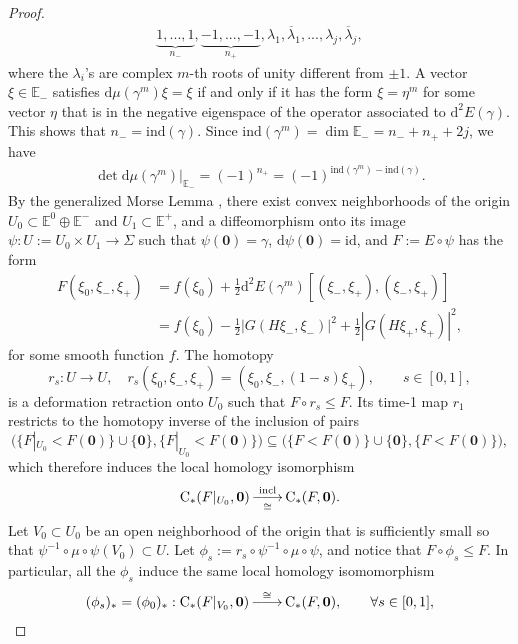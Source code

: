 \documentclass[reqno]{amsart}
\numberwithin{equation}{section}
\theoremstyle{personal}%
\theoremstyle{definition}
\newcommand{\E}{\mathds{E}}
\newcommand{\diff}{\mathrm{d}}
\newcommand{\incl}{\mathrm{incl}}
\newcommand{\Loc}{\mathrm{C}}
\newcommand{\ind}{\mathrm{ind}}
\DeclareRobustCommand{\llongrightarrow}{\relbar\joinrel\relbar\joinrel\rightarrow}
\DeclareMathOperator*{\ttoup}{\llongrightarrow}
\begin{document}
\begin{proof}
\begin{align*}
\underbrace{1,...,1}_{n_-},\underbrace{-1,...,-1}_{n_+},\lambda_1,\overline\lambda_1,...,\lambda_j,\overline\lambda_j,
\end{align*}
where the $\lambda_i$'s are complex $m$-th roots of unity different from $\pm1$. A vector $\xi\in\E_-$ satisfies $\diff\mu(\gamma^m)\xi=\xi$ if and only if it has the form $\xi=\eta^m$ for some vector $\eta$ that is in the negative eigenspace of the operator associated to $\diff^2E(\gamma)$. This shows that $n_-=\ind(\gamma)$. Since $\ind(\gamma^m)=\dim\E_-=n_-+n_++2j$, we have
\begin{align}
\label{e:det}
 \det\diff\mu(\gamma^m)|_{\E_-}
 =
 (-1)^{n_+}
 =
 (-1)^{\ind(\gamma^m)-\ind(\gamma)}.
\end{align}
By the generalized Morse Lemma \cite[Lemma~1]{Gromoll:1969jy}, there exist convex neighborhoods of the origin 
$U_0\subset\E^0\oplus\E^-$ and $U_1\subset\E^+$, 
and a diffeomorphism onto its image $\psi:U:=U_0\times U_1\to\Sigma$ such that $\psi(\bm0)=\gamma$, $\diff\psi(\bm0)=\mathrm{id}$, and $F:=E\circ\psi$ has the form 
\begin{align*}
F(\xi_0,\xi_-,\xi_+)
&=f(\xi_0)+\tfrac12\diff^2E(\gamma^m)[(\xi_-,\xi_+),(\xi_-,\xi_+)]\\ 
&=f(\xi_0)
-\tfrac12|G(H\xi_-,\xi_-)|^2
+\tfrac12|G(H\xi_+,\xi_+)|^2,
\end{align*}
for some smooth function $f$. The homotopy 
\[r_s:U\to U,
\quad
r_s(\xi_0,\xi_-,\xi_+)=(\xi_0,\xi_-,(1-s)\xi_+),
\qquad s\in[0,1],\] is a deformation retraction onto $U_0$ such that $F\circ r_s\leq F$. Its time-1 map $r_1$ restricts to the homotopy inverse of the inclusion of pairs
\[
\big(\{F|_{U_0}<F(\bm0)\}\cup\{\bm0\},\{F|_{U_0}<F(\bm0)\}\big)
\subseteq
\big(\{F<F(\bm0)\}\cup\{\bm0\},\{F<F(\bm0)\}\big),
\]
which therefore induces the local homology isomorphism
\begin{align*}
 \Loc_*(F|_{U_0},\bm0)
 \ttoup_{\cong}^{\incl}
 \Loc_*(F,\bm0).
\end{align*}
Let $V_0\subset U_0$ be an open neighborhood of the origin that is sufficiently small so that $\psi^{-1}\circ\mu\circ\psi(V_0)\subset U$. Let $\phi_s:=r_s\circ\psi^{-1}\circ\mu\circ\psi$, and notice that $F\circ \phi_s\leq F$. In particular, all the $\phi_s$ induce the same local homology isomomorphism
\begin{align*}
(\phi_s)_*=(\phi_0)_*:\Loc_*(F|_{V_0},\bm0)\ttoup^{\cong}\Loc_*(F,\bm0),
\qquad\forall s\in[0,1],
\end{align*}

\end{proof}
\end{document}
